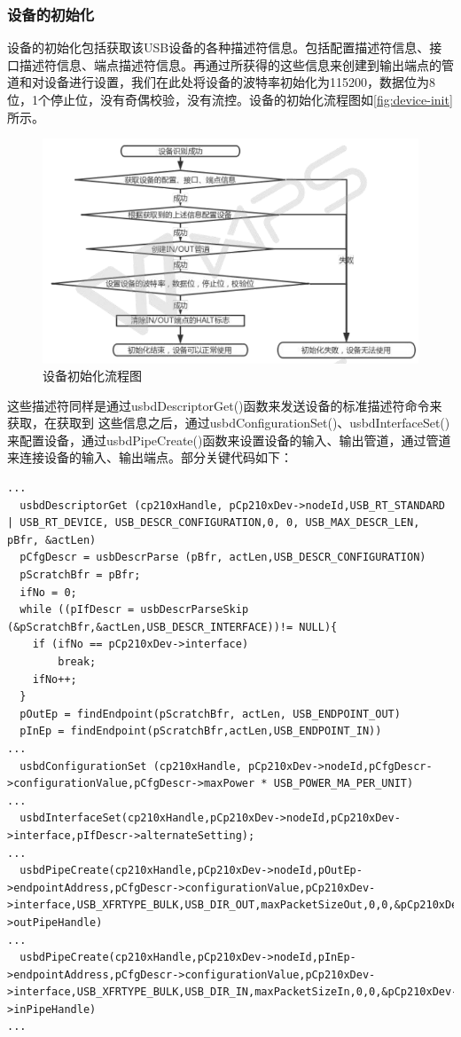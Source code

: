 	
	
	



\subsubsection{设备的初始化}

	设备的初始化包括获取该USB设备的各种描述符信息。包括配置描述符信息、接口描述符信息、端点描述符信息。再通过所获得的这些信息来创建到输出端点的管道和对设备进行设置，我们在此处将设备的波特率初始化为115200，数据位为8位，1个停止位，没有奇偶校验，没有流控。设备的初始化流程图如\autoref{fig:device-init}所示。
\begin{figure}[!h]
\centering
\includegraphics[width=1.0\textwidth]{./graphics/Dev-Init.pdf}
\caption{设备初始化流程图}\label{fig:device-init}
\end{figure}

这些描述符同样是通过usbdDescriptorGet()函数来发送设备的标准描述符命令来获取，在获取到
这些信息之后，通过usbdConfigurationSet()、usbdInterfaceSet()来配置设备，通过usbdPipeCreate()函数来设置设备的输入、输出管道，通过管道来连接设备的输入、输出端点。部分关键代码如下：
\lstset{language=C}
\begin{lstlisting}
...  
  usbdDescriptorGet (cp210xHandle, pCp210xDev->nodeId,USB_RT_STANDARD | USB_RT_DEVICE, USB_DESCR_CONFIGURATION,0, 0, USB_MAX_DESCR_LEN, pBfr, &actLen) 
  pCfgDescr = usbDescrParse (pBfr, actLen,USB_DESCR_CONFIGURATION)
  pScratchBfr = pBfr;
  ifNo = 0;
  while ((pIfDescr = usbDescrParseSkip (&pScratchBfr,&actLen,USB_DESCR_INTERFACE))!= NULL){
    if (ifNo == pCp210xDev->interface)
		break;
	ifNo++;
  }
  pOutEp = findEndpoint(pScratchBfr, actLen, USB_ENDPOINT_OUT)
  pInEp = findEndpoint(pScratchBfr,actLen,USB_ENDPOINT_IN))
...  
  usbdConfigurationSet (cp210xHandle, pCp210xDev->nodeId,pCfgDescr->configurationValue,pCfgDescr->maxPower * USB_POWER_MA_PER_UNIT)
...  
  usbdInterfaceSet(cp210xHandle,pCp210xDev->nodeId,pCp210xDev->interface,pIfDescr->alternateSetting);
...  
  usbdPipeCreate(cp210xHandle,pCp210xDev->nodeId,pOutEp->endpointAddress,pCfgDescr->configurationValue,pCp210xDev->interface,USB_XFRTYPE_BULK,USB_DIR_OUT,maxPacketSizeOut,0,0,&pCp210xDev->outPipeHandle)
...  
  usbdPipeCreate(cp210xHandle,pCp210xDev->nodeId,pInEp->endpointAddress,pCfgDescr->configurationValue,pCp210xDev->interface,USB_XFRTYPE_BULK,USB_DIR_IN,maxPacketSizeIn,0,0,&pCp210xDev->inPipeHandle)
...
\end{lstlisting}


